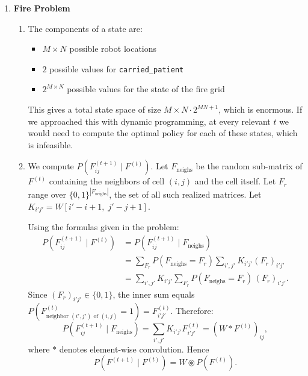 \documentclass{64110}
\author{Emira Ibrahimović}
\begin{document}
\begin{enumerate}

\item \textbf{Fire Problem}

\begin{enumerate}

\item[(i)]
The components of a state are:
\begin{itemize}
  \item $M \times N$ possible robot locations
  \item $2$ possible values for \texttt{carried\_patient}
  \item $2^{M \times N}$ possible values for the state of the fire grid
\end{itemize}
This gives a total state space of size $M \times N \cdot 2^{MN+1}$, which is enormous.
If we approached this with dynamic programming, at every relevant $t$ we would need to
compute the optimal policy for each of these states, which is infeasible.

\item[(ii)]
We compute $P(F_{ij}^{(t+1)} \mid F^{(t)})$.
Let $F_{\mathrm{neighs}}$ be the random sub-matrix of $F^{(t)}$ containing the
neighbors of cell $(i,j)$ and the cell itself.
Let $F_r$ range over $\{0,1\}^{|F_{\mathrm{neighs}}|}$, the set of all such
realized matrices.
Let $K_{i'j'} = W[i'-i+1,\; j'-j+1]$.

Using the formulas given in the problem:
\begin{align*}
P(F_{ij}^{(t+1)} \mid F^{(t)})
&= P(F_{ij}^{(t+1)} \mid F_{\mathrm{neighs}}) \\
&= \sum_{F_r} P(F_{\mathrm{neighs}} = F_r)
   \sum_{i',j'} K_{i'j'} (F_r)_{i'j'} \\
&= \sum_{i',j'} K_{i'j'}
   \sum_{F_r} P(F_{\mathrm{neighs}} = F_r)\,(F_r)_{i'j'}.
\end{align*}
Since $(F_r)_{i'j'} \in \{0,1\}$, the inner sum equals $P(F^{(t)}_{\text{neighbor }(i',j')\text{ of }(i,j)} = 1) = F^{(t)}_{i'j'}$.
Therefore:
\[
  P(F_{ij}^{(t+1)} \mid F_{\mathrm{neighs}}) = \sum_{i',j'} K_{i'j'} F^{(t)}_{i'j'}
  = (W * F^{(t)})_{ij},
\]
where $*$ denotes element-wise convolution. Hence
\[
  P(F^{(t+1)} \mid F^{(t)}) = W \circledast P(F^{(t)}).
\]


\end{enumerate}
\end{enumerate}
\end{document}
